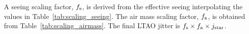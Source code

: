 \documentclass[12pt]{report}
\begin{document}
A seeing scaling factor, $f_{\rm s}$, is derived from the effective seeing interpolating the values in Table~\ref{tab:scaling_seeing}. The air mass scaling factor, $f_{\rm a}$, is obtained from Table~\ref{tab:scaling_airmass}. The final LTAO jitter is $f_{\rm s} \times f_{\rm a} \times j_{\rm star}$.




% 
% 
% 
% 
% 
% 
% 



\cleardoublepage
{}




\end{document}
